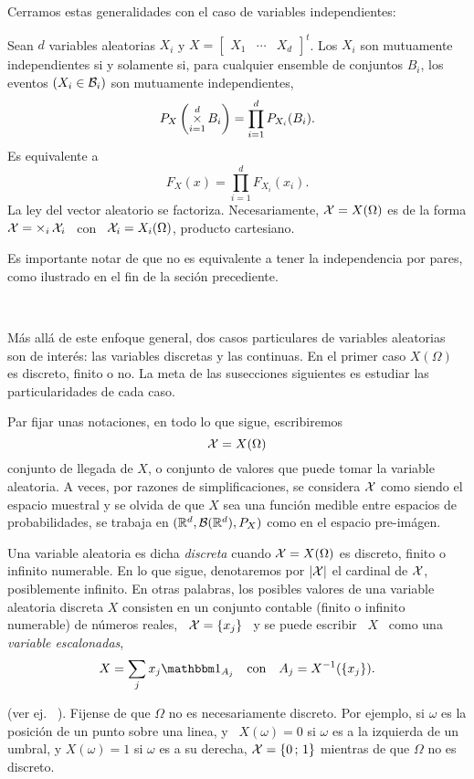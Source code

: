 Cerramos estas generalidades con el caso de variables independientes:
%
\begin{definicion}[Independencia]
  Sean $d$  variables aleatorias  $X_i$ y  $X = \begin{bmatrix}  X_1 &  \cdots &
    X_d  \end{bmatrix}^t$.   Los  $X_i$   son  mutuamente  independientes  si  y
  solamente si,  para cualquier ensemble  de conjuntos $B_i$, los  eventos $(X_i
  \in \mathcal{B}_i)$ son mutuamente independientes, \ie
  \[
  P_X\left( \operatorname*{\times}_{i=1}^d B_i \right) = \prod_{i=1}^d P_{X_i}(B_i).
  \]
  Es equivalente a
  \[
  F_X(x) = \prod_{i=1}^d F_{X_i}(x_i).
  \]
  La ley del vector aleatorio se factoriza.  Necesariamente, $\mathcal{X} = X(\Omega)$ es
  de la  forma $\mathcal{X}  = \operatorname*{\times}_i \mathcal{X}_i$  \ con  \ $\mathcal{X}_i =  X_i(\Omega)$, producto
  cartesiano.
\end{definicion}
%
\noindent Es importante notar de que  no es equivalente a tener la independencia
por pares, como ilustrado en el fin de la seci\'on precediente.

\

M\'as  all\'a de  este  enfoque  general, dos  casos  particulares de  variables
aleatorias son  de inter\'es:  las variables discretas  y las continuas.   En el
primer caso  $X(\Omega)$ es discreto, finito  o no.  La meta  de las susecciones
siguientes es estudiar las particularidades de cada caso.

Par fijar unas notaciones, en todo lo que sigue, escribiremos
%
\[
\mathcal{X} = X(\Omega)
\]
%
conjunto de  llegada de $X$, o conjunto  de valores que puede  tomar la variable
aleatoria.  A  veces, por  razones de simplificaciones,  se considera  $\mathcal{X}$ como
siendo el  espacio muestral  y se olvida  de que  $X$ sea una  funci\'on medible
entre espacios de probabilidades,  \ie se trabaja en $(\mathbb{R}^d,\mathcal{B}(\mathbb{R}^d),P_X)$
como en el espacio pre-im\'agen.




\label{Ssec:MP:VADiscreta}

\begin{definicion}
  Una  variable aleatoria es  dicha {\it  discreta} cuando  $\mathcal{X} =  X(\Omega)$ es
  discreto,  finito o  infinito numerable.   En  lo que  sigue, denotaremos  por
  $|\mathcal{X}|$  el cardinal  de $\mathcal{X}$,  posiblemente infinito.  En otras  palabras, los
  posibles  valores de  una  variable  aleatoria discreta  $X$  consisten en  un
  conjunto contable (finito  o infinito numerable) de n\'umeros  reales, \ $\mathcal{X} =
  \{ x_j \}$ \ y se puede escribir \ $X$ \ como una {\it variable escalonadas},
  \[
  X = \sum_j x_j \un_{A_j} \quad \mbox{con} \quad A_j = X^{-1}(\{ x_j \}).
  \]
\end{definicion}
%
\noindent (ver ej.  ~\cite{AthLah06, HogMck13}).  Fijense de que  $\Omega$ no es
necesariamente discreto.  Por ejemplo, si  $\omega$ es la posici\'on de un punto
sobre una linea, y \ $X(\omega) = 0$ si $\omega$ es a la izquierda de un umbral, y
$X(\omega) = 1$ si $\omega$  es a su derecha, $\mathcal{X} = \{ 0 \,  ; \, 1 \}$ mientras
de que $\Omega$ no es discreto.

